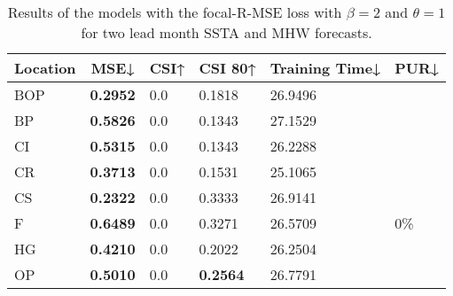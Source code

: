 \documentclass[11pt, a4paper]{article}
\begin{document}
\begin{table}[H]
\centering
\small
\caption{Results of the models with the focal-R-MSE loss with $\beta=2$ and $\theta=1$ for two lead month SSTA and MHW forecasts.}
\begin{tabular}{llllll}
\multicolumn{1}{c}{\textbf{Location}} & \multicolumn{1}{c}{\textbf{MSE↓}} & \multicolumn{1}{c}{\textbf{CSI↑}} & \multicolumn{1}{c}{\textbf{CSI 80↑}} & \multicolumn{1}{c}{\textbf{Training Time↓}} & \multicolumn{1}{c}{\textbf{PUR↓}} \\ \hline
BOP                         & \textbf{0.2952}                   & 0.0                               & 0.1818                               & 26.9496                                     &                                   \\
BP                        & \textbf{0.5826}                   & 0.0                               & 0.1343                               & 27.1529                                     &                                   \\
CI                        & \textbf{0.5315}                   & 0.0                               & 0.1343                               & 26.2288                                     &                                   \\
CR                           & \textbf{0.3713}                   & 0.0                               & 0.1531                               & 25.1065                                     &                                   \\
CS                           & \textbf{0.2322}                   & 0.0                               & 0.3333                               & 26.9141                                     &                                   \\
F                             & \textbf{0.6489}                   & 0.0                               & 0.3271                               & 26.5709                                     & 0\%                               \\
HG                          & \textbf{0.4210}                   & 0.0                               & 0.2022                               & 26.2504                                     &                                   \\
OP                       & \textbf{0.5010}                   & 0.0                               & \textbf{0.2564}                      & 26.7791                                     &                                   \\

\end{tabular}
\end{table}
\end{document}
